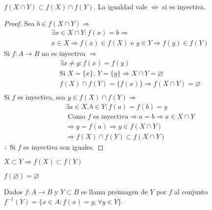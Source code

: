 \begin{prop}
    \(f(X \cap Y) \subset f(X) \cap f(Y)\). La igualdad vale \(\iff\) si es inyectiva.
    \begin{proof}
        Sea \(b \in f(X \cap Y) \Rightarrow\) \begin{align*}
             & \exists x \in X \cap Y : f(x) = b \Rightarrow                                  \\
             & x \in X \Rightarrow f(x) \in f(X) \text{ e } y \in Y \Rightarrow f(y) \in f(Y)
        \end{align*}
        Si \(f: A \to B\) no es inyectiva \(\Rightarrow\)
        \begin{align*}
             & \exists x \neq y : f(x) = f(y)                                             \\
             & \text{Si } X = \{x\}\text{, } Y = \{y\} \Rightarrow X \cap Y = \varnothing \\
             & f(X) \cap f(Y) = \{f(x)\} \Rightarrow f(X \cap Y) = \varnothing            \\
        \end{align*}
        Si \(f\) es inyectiva, sea \(y \in f(X) \cap f(Y) \Rightarrow\)
        \begin{align*}
             & \exists a \in X, b \in Y : f(a) = f(b) = y                                       \\
             & \text{ Como }f \text{ es inyectiva} \Rightarrow a = b \Rightarrow a \in X \cap Y \\
             & \Rightarrow y = f(a) \Rightarrow y \in f(X \cap Y)                               \\
             & \Rightarrow f(X) \cap f(Y) \subset f(X \cap Y)
        \end{align*}
        \(\therefore\) Si \(f\) es inyectiva son iguales.
    \end{proof}
\end{prop}


\begin{prop}
    \(X \subset Y \Rightarrow f(X) \subset f(Y)\)
\end{prop}

\begin{prop}
    \(f(\varnothing) = \varnothing\)
\end{prop}

\begin{definition}
    Dados \(f: A \to B\) y \(Y \subset B\) se llama preimagen de \(Y\) por \(f\) al conjunto \(f^{-1}(Y) = \{x \in A : f(x) = y, \forall y \in Y\}\).
\end{definition}

